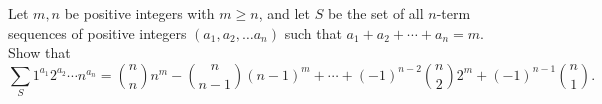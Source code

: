 Let $m,n$ be positive integers with $m \geq n$, and let $S$ be the set of all $n$-term sequences of positive integers $(a_1, a_2, \ldots a_n)$ such that $a_1 + a_2 + \cdots + a_n = m$. Show that \[\sum_S 1^{a_1} 2^{a_2} \cdots n^{a_n} = {n \choose n} n^m - {n \choose n-1} (n-1)^m + \cdots + (-1)^{n-2} {n \choose 2} 2^m + (-1)^{n-1} {n \choose 1}.\]